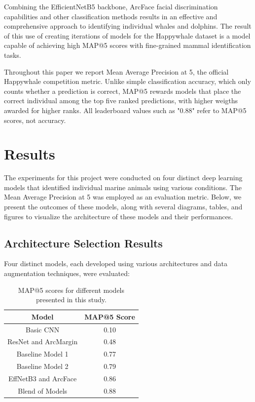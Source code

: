 \documentclass[twocolumn]{article}
\begin{document}
Combining the EfficientNetB5 backbone, ArcFace facial discrimination capabilities and other classification methods results in an effective and comprehensive approach to identifying individual whales and dolphins. The result of this use of creating iterations of models for the Happywhale dataset is a model capable of achieving high MAP@5 scores with fine-grained mammal identification tasks.

Throughout this paper we report Mean Average Precision at 5, the official Happywhale competition metric. Unlike simple classification accuracy, which only counts whether a prediction is correct, MAP@5 rewards models that place the correct individual among the top five ranked predictions, with higher weigths awarded for higher ranks. All leaderboard values such as "0.88" refer to MAP@5 scores, not accuracy.

\section{Results}

The experiments for this project were conducted on four distinct deep learning models that identified individual marine animals using various conditions. The Mean Average Precision at 5 was employed as an evaluation metric. Below, we present the outcomes of these models, along with several diagrams, tables, and figures to visualize the architecture of these models and their performances.

\subsection{Architecture Selection Results}

Four distinct models, each developed using various architectures and data augmentation techniques, were evaluated:

\begin{table}[ht!]
\centering
\begin{tabular}{|c|c|}
\hline
\textbf{Model} & \textbf{MAP@5 Score}\\ 
\hline
Basic CNN & 0.10 \\ 
\hline
ResNet and ArcMargin & 0.48 \\ 
\hline
Baseline Model 1 & 0.77 \\
\hline
Baseline Model 2 & 0.79 \\
\hline
EffNetB3 and ArcFace& 0.86 \\ 
\hline
Blend of Models & 0.88 \\ 
\hline
\end{tabular}
\caption{MAP@5 scores for different models presented in this study.}
\label{tab:model_scores}
\end{table}
\end{document}
